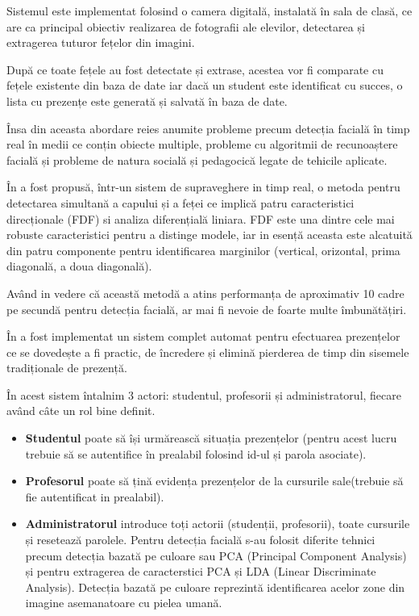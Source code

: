 \documentclass[a4paper, 12pt]{article}
\begin{document}
	Sistemul este implementat folosind o camera digitală, instalată în sala de clasă, ce are ca principal obiectiv realizarea de fotografii ale elevilor, detectarea și extragerea tuturor fețelor din imagini.
	
	După ce toate fețele au fost detectate și extrase, acestea vor fi comparate cu fețele existente din baza de date iar dacă un student este identificat cu succes, o lista cu prezențe este generată și salvată în baza de date.
	
	Însa din aceasta abordare reies anumite probleme precum detecția facială în timp real în medii ce conțin obiecte multiple, probleme cu algoritmii de recunoaștere facială și probleme de natura socială și pedagocică legate de tehicile aplicate. 
	
	\bigskip
	În \textbf{\cite{ishii2004face}} a fost propusă, într-un sistem de supraveghere in timp real, o metoda pentru detectarea simultană a capului și a feței ce implică patru caracteristici direcționale (FDF) si analiza diferențială liniara. FDF este una dintre cele mai robuste caracteristici pentru a distinge modele, iar in esență aceasta este alcatuită din patru componente pentru identificarea marginilor (vertical, orizontal, prima diagonală, a doua diagonală).
	
	Având in vedere că această metodă a atins performanța de aproximativ 10 cadre pe secundă pentru detecția facială, ar mai fi nevoie de foarte multe îmbunătățiri.
	
	\bigskip
	În \textbf{\cite{jha2007class}} a fost implementat un sistem complet automat pentru efectuarea prezențelor ce se dovedește a fi practic, de încredere și elimină pierderea de timp din sisemele tradiționale de prezență.
	
	În acest sistem întalnim 3 actori: studentul, profesorii și administratorul, fiecare având câte un rol bine definit. 
	
	\begin{itemize}
		\item\textbf{Studentul} poate să își urmărească situația prezențelor (pentru acest lucru trebuie să se autentifice în prealabil folosind id-ul și parola asociate).
		\item\textbf{Profesorul} poate să țină evidența prezențelor de la cursurile sale(trebuie să fie autentificat in prealabil).
		\item\textbf{Administratorul} introduce toți actorii (studenții, profesorii), toate cursurile și resetează parolele.
		Pentru detecția facială s-au folosit diferite tehnici precum detecția bazată pe culoare sau PCA (Principal Component Analysis) și pentru extragerea de caracterstici PCA și LDA (Linear Discriminate Analysis). Detecția bazată pe culoare reprezintă identificarea acelor zone din imagine asemanatoare cu pielea umană.
	\end{itemize}
	
\end{document}
